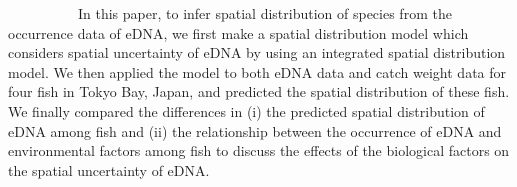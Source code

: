 \documentclass[12pt]{article}
\begin{document}
\begin{linenumbers}


\ \ \ \ \ \ \ \ \ \ 
In this paper, to infer spatial distribution of species from the occurrence data of eDNA, we first make a spatial distribution model which considers spatial uncertainty of eDNA by using an integrated spatial distribution model. We then applied the model to both eDNA data and catch weight data for four fish in Tokyo Bay, Japan, and predicted the spatial distribution of these fish. We finally compared the differences in (i) the predicted spatial distribution of eDNA among fish and (ii) the relationship between the occurrence of eDNA and environmental factors among fish to discuss the effects of the biological factors on the spatial uncertainty of eDNA.




\end{linenumbers}
\end{document}
